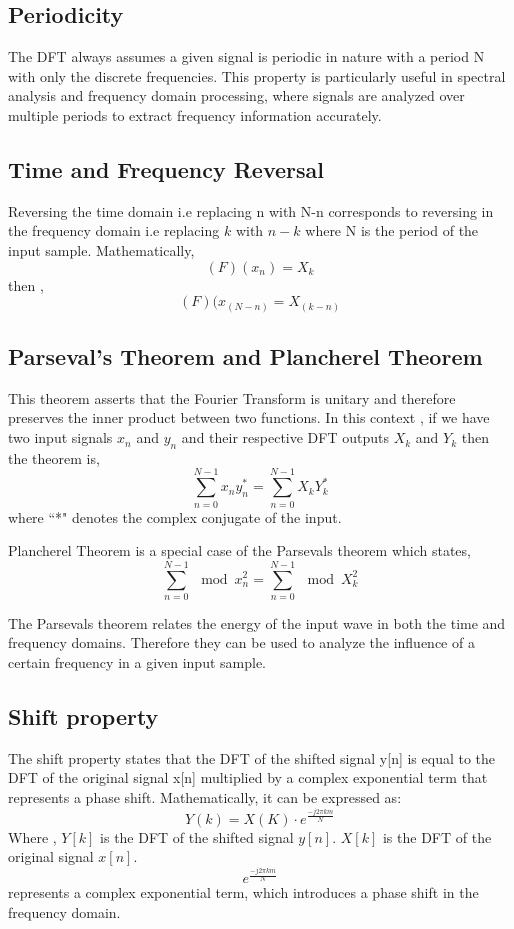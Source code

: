\documentclass[11pt]{amsart}
\theoremstyle{definition}
\theoremstyle{remark}
\numberwithin{equation}{section}
\begin{document}
\subsection{Periodicity}
The DFT always assumes a given signal is periodic in nature with a period N with only the discrete frequencies.
This property is particularly useful in spectral analysis and frequency domain processing, where signals are analyzed over multiple periods to extract frequency information accurately.

\subsection{Time and Frequency Reversal}
Reversing the time domain i.e replacing n with N-n corresponds to reversing in the frequency domain i.e replacing $k$ with $n-k$ where N is the period of the input sample.
Mathematically,
\[(F)(x_n) = X_k \] then , 
\[(F)(x_(N-n) = X_(k-n)\]

\subsection{Parseval's Theorem and Plancherel Theorem}
This theorem asserts that the Fourier Transform is unitary and therefore preserves the inner product between two functions. In this context , if we have two input signals $x_n$ and $y_n$ and their respective DFT outputs $X_k$ and $Y_k$ then the theorem is, 
\[\sum_{n = 0}^{N-1} x_n y_n^{*} = \sum_{n=0}^{N-1} X_k Y_k^{*}\]
where ``*" denotes the complex conjugate of the input.

Plancherel Theorem is a special case of the Parsevals theorem which states,
\[\sum_{n = 0}^{N-1} \mod{ x_n^2} = \sum_{n=0}^{N-1} \mod{ X_k^2}\]

The Parsevals theorem relates the energy of the input wave in both the time and frequency domains. Therefore they can be used to analyze the influence of a certain frequency in a given input sample. 

\subsection{Shift property}
The shift property states that the DFT of the shifted signal y[n] is equal to the DFT of the original signal x[n] multiplied by a complex exponential term that represents a phase shift. Mathematically, it can be expressed as:
\[Y(k) = X(K) \cdot e^{\frac{-j2 \pi k m}{N}}\]
Where , 
$Y[k]$ is the DFT of the shifted signal $y[n]$.
$X[k]$ is the DFT of the original signal $x[n]$.
\[e^{\frac{-j 2 \pi km}{N}}\] represents a complex exponential term, which introduces a phase shift in the frequency domain.
\end{document}
